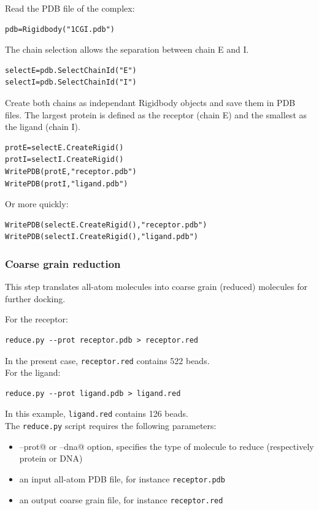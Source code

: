 \documentclass[12pt,a4paper]{article}
\begin{document}
Read the PDB file of the complex:
\begin{verbatim}
pdb=Rigidbody("1CGI.pdb")
\end{verbatim}

The chain selection allows the separation between chain E and I.
\begin{verbatim}
selectE=pdb.SelectChainId("E")
selectI=pdb.SelectChainId("I")
\end{verbatim}

Create both chains as independant Rigidbody objects and save them in PDB files. 
The largest protein is defined as the receptor (chain E) and the smallest 
as the ligand (chain I).

\begin{verbatim}
protE=selectE.CreateRigid()
protI=selectI.CreateRigid()
WritePDB(protE,"receptor.pdb")
WritePDB(protI,"ligand.pdb")
\end{verbatim}
Or more quickly:
\begin{verbatim}
WritePDB(selectE.CreateRigid(),"receptor.pdb")
WritePDB(selectI.CreateRigid(),"ligand.pdb")
\end{verbatim}

\subsubsection{Coarse grain reduction}

This step translates all-atom molecules into coarse grain (reduced) molecules for further docking. 

For the receptor: 
\begin{verbatim}
reduce.py --prot receptor.pdb > receptor.red
\end{verbatim}
In the present case, {\tt receptor.red} contains 522 beads.\\

For the ligand:
\begin{verbatim}
reduce.py --prot ligand.pdb > ligand.red
\end{verbatim}
In this example, {\tt ligand.red} contains 126 beads. \\

The {\tt reduce.py} script requires the following parameters:

\begin{itemize}
\item \verb@--prot@ or \verb@--dna@ option, specifies the type of molecule to reduce (respectively protein or DNA)
\item an input all-atom PDB file, for instance {\tt receptor.pdb}
\item an output coarse grain file, for instance {\tt receptor.red}
\end{itemize}
\end{document}
